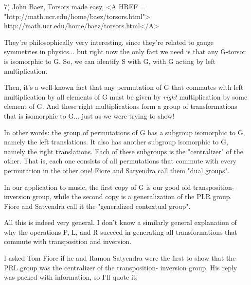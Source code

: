 7) John Baez, Torsors made easy, 
<A HREF = "http://math.ucr.edu/home/baez/torsors.html">
http://math.ucr.edu/home/baez/torsors.html</A>

They're philosophically very interesting, since they're related
to gauge symmetries in physics... but right now the only fact we
need is that any G-torsor is isomorphic to G.  So, we can identify 
S with G, with G acting by left multiplication.  

Then, it's a well-known fact that any permutation of G that
commutes with left multiplication by all elements of G must be 
given by \emph{right} multiplication by some element of G.  And
these right multiplications form a group of transformations 
that is isomorphic to G... just as we were trying to show!

In other words: the group of permutations of G has a subgroup 
isomorphic to G, namely the left translations.  It also has
another subgroup isomorphic to G, namely the right translations.
Each of these subgroups is the "centralizer" of the other.  That
is, each one consists of all permutations that commute with every 
permutation in the other one!   Fiore and Satyendra call them 
"dual groups".  

In our application to music, the first copy of G is our good old 
transposition-inversion group, while the second copy is a 
generalization of the PLR group.  Fiore and Satyendra call it the 
"generalized contextual group".

All this is indeed very general.  I don't know a similarly 
general explanation of why the operations P, L, and R succeed 
in generating all transformations that commute with transposition 
and inversion.  

I asked Tom Fiore if he and Ramon Satyendra were the first to 
show that the PRL group was the centralizer of the transposition-
inversion group.  His reply was packed with information, so 
I'll quote it:

